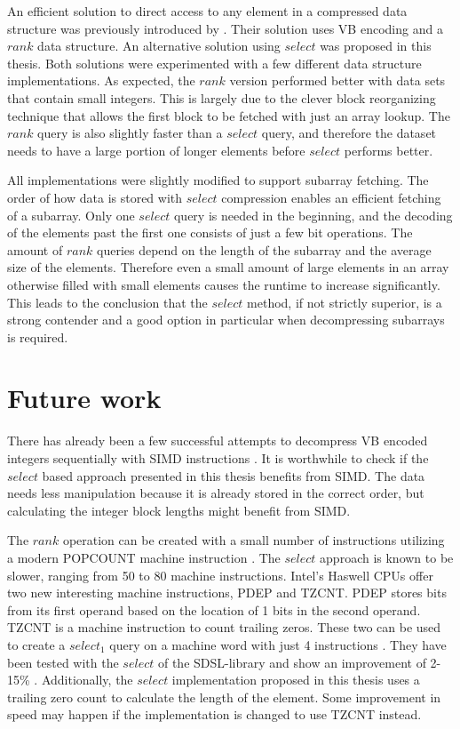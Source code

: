 An efficient solution to direct access to any element in a compressed data structure was previously introduced by \citeauthor{Bri09}. Their solution uses VB encoding and a $rank$ data structure. 
An alternative solution using $select$ was proposed in this thesis. Both solutions were experimented with a few different data structure implementations. As expected, the $rank$ version performed better with data sets that contain small integers. This is largely due to the 
clever block reorganizing technique that allows the first block to be fetched with just an array lookup. The $rank$ query is also slightly faster than a $select$ query, and therefore the dataset needs 
to have a large portion of longer elements before $select$ performs better. 

All implementations were slightly modified to support subarray fetching. The order of how data is stored with $select$ compression enables an efficient fetching of a subarray. Only one $select$ query 
is needed in the beginning, and the decoding of the elements past the first one consists of just a few bit operations. The amount of $rank$ queries depend on the length of the subarray and the average 
size of the elements. Therefore even a small amount of large elements in an array otherwise filled with small elements causes the runtime to increase significantly. This leads to the conclusion that the $select$ method, 
if not strictly superior, is a strong contender and a good option in particular when decompressing subarrays is required.

\section{Future work}
There has already been a few successful attempts to decompress VB encoded integers sequentially with SIMD instructions \citep{Lem18,Pla15}. It is worthwhile to check if the $select$ based approach presented 
in this thesis benefits from SIMD. The data needs less manipulation because it is already stored in the correct order, but calculating the integer block lengths might benefit from SIMD.

The $rank$ operation can be created with a small number of instructions utilizing a modern \textsc{POPCOUNT} machine instruction \citep{Zho13}. The $select$ approach is 
known to be slower, ranging from 50 to 80 machine instructions. Intel's Haswell CPUs offer two new interesting machine instructions, \textsc{PDEP} and \textsc{TZCNT}. \textsc{PDEP} stores bits
from its first operand based on the location of 1 bits in the second operand. \textsc{TZCNT} is a machine instruction to count trailing zeros. These two can be used to create a $select_1$ query on 
a machine word with just 4 instructions \citep{Pan17a}. They have been tested with the $select$ of the SDSL-library and show an improvement of 2-15\% \citep{Pan17b}. Additionally, the 
$select$ implementation proposed in this thesis uses a trailing zero count to calculate the length of the element. Some improvement in speed may happen if the implementation is changed 
to use \textsc{TZCNT} instead.


